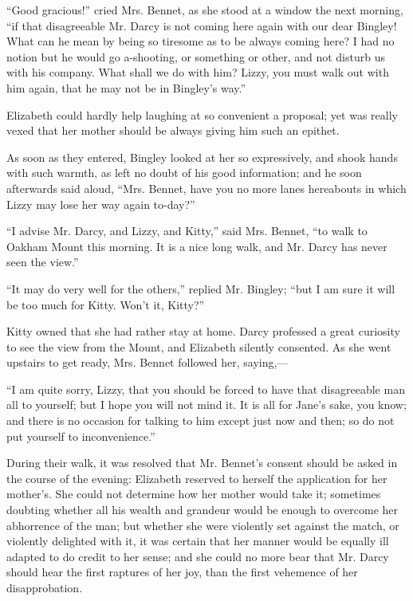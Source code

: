 \documentclass[12pt]{book}
\begin{document}
``Good gracious!'' cried Mrs. Bennet, as she stood at a window the next morning, ``if that disagreeable Mr. Darcy is not coming here again with our dear Bingley! What can he mean by being so tiresome as to be always coming here? I had no notion but he would go a-shooting, or something or other, and not disturb us with his company. What shall we do with him? Lizzy, you must walk out with him again, that he may not be in Bingley's way.''

Elizabeth could hardly help laughing at so convenient a proposal; yet was really vexed that her mother should be always giving him such an epithet.

As soon as they entered, Bingley looked at her so expressively, and shook hands with such warmth, as left no doubt of his good information; and he soon afterwards said aloud, ``Mrs. Bennet, have you no more lanes hereabouts in which Lizzy may lose her way again to-day?''

``I advise Mr. Darcy, and Lizzy, and Kitty,'' said Mrs. Bennet, ``to walk to Oakham Mount this morning. It is a nice long walk, and Mr. Darcy has never seen the view.''

``It may do very well for the others,'' replied Mr. Bingley; ``but I am sure it will be too much for Kitty. Won't it, Kitty?''

Kitty owned that she had rather stay at home. Darcy professed a great curiosity to see the view from the Mount, and Elizabeth silently consented. As she went upstairs to get ready, Mrs. Bennet followed her, saying,---

``I am quite sorry, Lizzy, that you should be forced to have that disagreeable man all to yourself; but I hope you will not mind it. It is all for Jane's sake, you know; and there is no occasion for talking to him except just now and then; so do not put yourself to inconvenience.''

During their walk, it was resolved that Mr. Bennet's consent should be asked in the course of the evening: Elizabeth reserved to herself the application for her mother's. She could not determine how her mother would take it; sometimes doubting whether all his wealth and grandeur would be enough to overcome her abhorrence of the man; but whether she were violently set against the match, or violently delighted with it, it was certain that her manner would be equally ill adapted to do credit to her sense; and she could no more bear that Mr. Darcy should hear the first raptures of her joy, than the first vehemence of her disapprobation.
\end{document}
